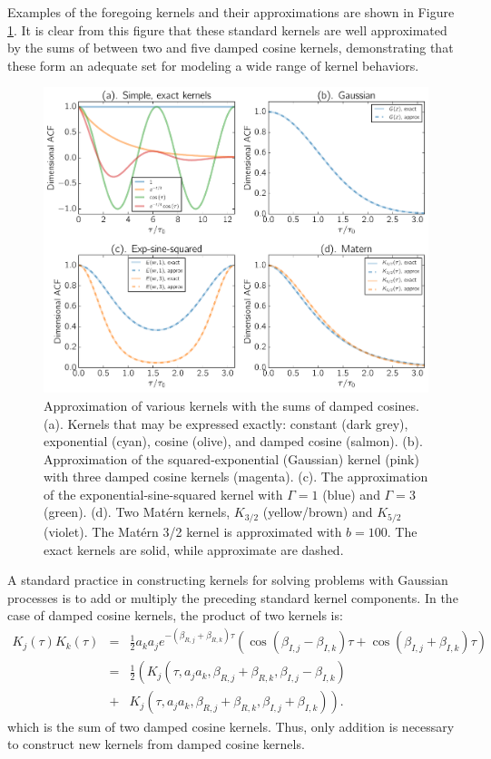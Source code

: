 \documentclass[manuscript, letterpaper]{aastex6}
\begin{document}
Examples of the foregoing kernels and their approximations are shown in Figure \ref{kernel_approx}.
It is clear from this figure that these standard kernels are well approximated by the sums
of between two and five damped cosine kernels, demonstrating that these form an adequate set
for modeling a wide range of kernel behaviors.

\begin{figure}[!htbp]
\begin{center}
\includegraphics[width=\textwidth]{./approximate_kernels/kernel_approx.pdf}
\caption{Approximation of various kernels with the sums of damped cosines.
(a). Kernels that may be expressed exactly: constant (dark grey), exponential (cyan),
cosine (olive), and damped cosine (salmon).
(b). Approximation of the squared-exponential (Gaussian) kernel (pink) with three
damped cosine kernels (magenta). (c). The approximation of the exponential-sine-squared
kernel with $\Gamma =1$ (blue) and $\Gamma = 3$ (green). (d). Two Mat\'ern kernels,
$K_{3/2}$ (yellow/brown) and $K_{5/2}$ (violet).  The Mat\'ern 3/2 kernel
is approximated with $b=100$. The exact kernels are solid, while approximate are dashed.}
\label{kernel_approx}
\end{center}
\end{figure}

A standard practice in constructing kernels for solving problems with Gaussian processes
is to add or multiply the preceding standard kernel components.  In the case of damped cosine
kernels, the product of two kernels is:
\begin{eqnarray}
K_j(\tau)K_k(\tau) &=&
\frac{1}{2} a_k a_j e^{-(\beta_{R,j}+\beta_{R,k}) \tau} \left(\cos{(\beta_{I,j}-\beta_{I,k})\tau}+\cos{(\beta_{I,j}+\beta_{I,k})\tau}\right)\\
&=& \frac{1}{2} \left(K_j(\tau,a_ja_k,\beta_{R,j}+\beta_{R,k},\beta_{I,j}-\beta_{I,k})\right.\\
&+&\left. K_j(\tau,a_ja_k,\beta_{R,j}+\beta_{R,k},\beta_{I,j}+\beta_{I,k})\right).
\end{eqnarray}
which is the sum of two damped cosine kernels.  Thus, only addition is necessary to
construct new kernels from damped cosine kernels.
\end{document}
